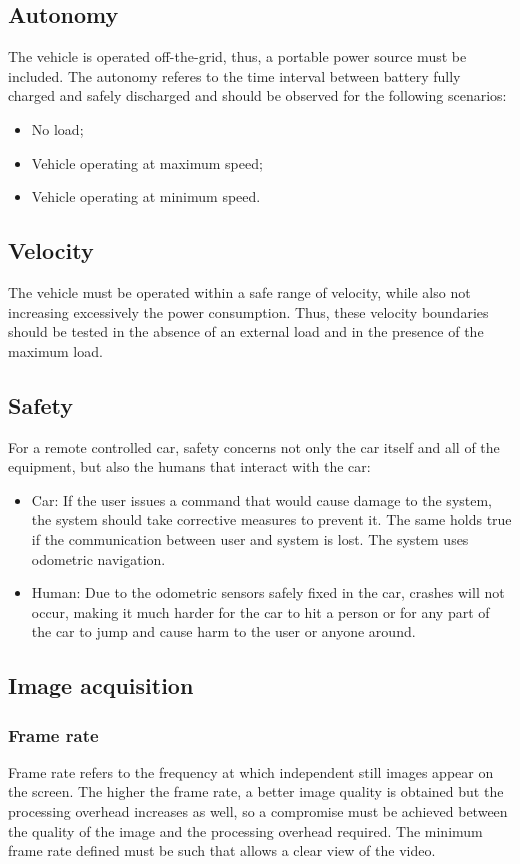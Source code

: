 \subsection{Autonomy}%
\label{sec:org7364ba5}
The vehicle is operated off-the-grid, thus, a portable power source must be included. The autonomy referes to the time interval between battery fully charged and safely discharged and should be observed for the following scenarios:
\begin{itemize}
\item No load;
\item Vehicle operating at maximum speed;
\item Vehicle operating at minimum speed.
\end{itemize}
\subsection{Velocity}%
\label{sec:org08718bc}
The vehicle must be operated within a safe range of velocity, while also not increasing excessively the power consumption. Thus, these velocity boundaries should be tested in the absence of an external load and in the presence of the maximum load.
\subsection{Safety}%
\label{sec:org83942c3}
For a remote controlled car, safety concerns not only the car itself and all of the equipment, but also the humans that interact with the car:
\begin{itemize}
\item Car: If the user issues a command that would cause damage to the system, the
system should take corrective measures to prevent it. The same holds true if
the communication between user and system is lost. The system uses odometric navigation.
\item Human: Due to the odometric sensors safely fixed in the car, crashes will not occur, making it much harder for the car to hit a person or for any part of the car to jump and cause harm to the user or anyone around.
\end{itemize}
\subsection{Image acquisition}%
\label{sec:orgb6a5f66}
\subsubsection{Frame rate}%
\label{sec:org5adf4ee}
Frame rate refers to the frequency at which independent still images appear on the screen. The higher the frame rate, a better image quality is obtained but the processing overhead increases as well, so a compromise must be achieved between the quality of the image and the processing overhead required. The minimum frame rate defined must be such that allows a clear view of the video.
